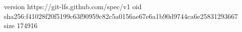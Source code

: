 version https://git-lfs.github.com/spec/v1
oid sha256:f41028f20f5199c63f90959c82c5a0156ae67e6a1b90d9744ca6e25831293667
size 174916
